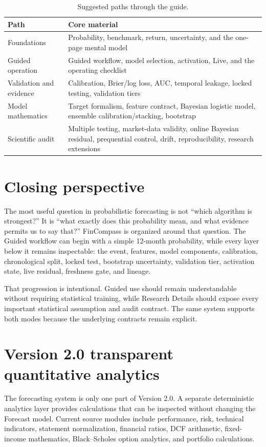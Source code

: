 \documentclass[11pt]{article}
\begin{document}
\begin{table}[H]
\centering
\small
\caption{Suggested paths through the guide.}
\begin{tabularx}{\textwidth}{@{}p{}X@{}}
\toprule
Path & Core material \\
\midrule
Foundations & Probability, benchmark, return, uncertainty, and the one-page mental model \\
Guided operation & Guided workflow, model selection, activation, Live, and the operating checklist \\
Validation and evidence & Calibration, Brier/log loss, AUC, temporal leakage, locked testing, validation tiers \\
Model mathematics & Target formalism, feature contract, Bayesian logistic model, ensemble calibration/stacking, bootstrap \\
Scientific audit & Multiple testing, market-data validity, online Bayesian residual, prequential control, drift, reproducibility, research extensions \\
\bottomrule
\end{tabularx}
\end{table}

\section{Closing perspective}

The most useful question in probabilistic forecasting is not ``which algorithm is strongest?'' It is ``what exactly does this probability mean, and what evidence permits us to say that?'' FinCompass is organized around that question. The Guided workflow can begin with a simple 12-month probability, while every layer below it remains inspectable: the event, features, model components, calibration, chronological split, locked test, bootstrap uncertainty, validation tier, activation state, live residual, freshness gate, and lineage.

That progression is intentional. Guided use should remain understandable without requiring statistical training, while Research Details should expose every important statistical assumption and audit contract. The same system supports both modes because the underlying contracts remain explicit.

\section{Version 2.0 transparent quantitative analytics}
The forecasting system is only one part of Version 2.0. A separate deterministic analytics layer provides calculations that can be inspected without changing the Forecast model. Current source modules include performance, risk, technical indicators, statement normalization, financial ratios, DCF arithmetic, fixed-income mathematics, Black--Scholes option analytics, and portfolio calculations.
\end{document}
